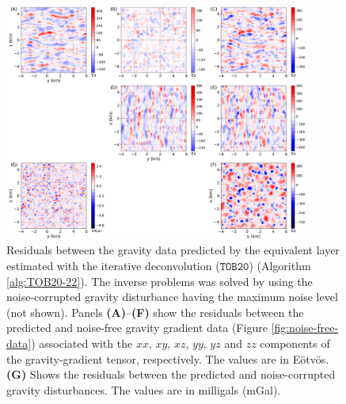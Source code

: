 \begin{figure}[htbp]
	\begin{center}
		\includegraphics[width=10cm]{Fig/TOB20_residuals}
	\end{center}
	\caption{
		Residuals between the gravity data predicted by the equivalent layer estimated with the 
		iterative deconvolution ($\mathtt{TOB20}$) (Algorithm \ref{alg:TOB20-22}).
		The inverse problems was solved by using the noise-corrupted gravity 
		disturbance having the maximum noise level (not shown).
		Panels \textbf{(A)}--\textbf{(F)} show the residuals between the predicted and noise-free
		gravity gradient data (Figure \ref{fig:noise-free-data}) associated with the
		$xx$, $xy$, $xz$, $yy$, $yz$ and $zz$ components of the gravity-gradient tensor, respectively. 
		The values are in Eötvös.
		\textbf{(G)} Shows the residuals between the predicted and noise-corrupted gravity disturbances.
		The values are in milligals (mGal).
		}
	\label{fig:residuals-TOB20}
\end{figure}

